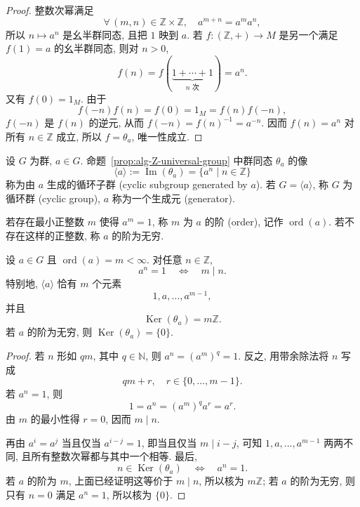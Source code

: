 \documentclass[usesamecnt, thmcnt=section, lang=cn, newtx, 10pt, scheme=chinese]{elegantbook}
\begin{document}
\begin{proof}
整数次幂满足
\[
\forall\,(m,n)\in\mathbb Z\times\mathbb Z,\quad a^{m+n}=a^ma^n,
\]
所以 $n\mapsto a^n$ 是幺半群同态, 且把 $1$ 映到 $a$. 若 $f:(\mathbb Z,+)\to M$ 是另一个满足 $f(1)=a$ 的幺半群同态, 则对 $n>0$,
\[
 f(n)=f(\underbrace{1+\cdots+1}_{n\text{ 次}})=a^n.
\]
又有 $f(0)=1_M$. 由于
\[
 f(-n)f(n)=f(0)=1_M=f(n)f(-n),
\]
$f(-n)$ 是 $f(n)$ 的逆元, 从而 $f(-n)=f(n)^{-1}=a^{-n}$. 因而 $f(n)=a^n$ 对所有 $n\in\mathbb Z$ 成立, 所以 $f=\theta_a$, 唯一性成立.
\end{proof}

\begin{definition}[循环子群与元素的阶]\label{def:alg-order-element}
设 $G$ 为群, $a\in G$. 命题~\ref{prop:alg-Z-universal-group} 中群同态 $\theta_a$ 的像
\[
 \langle a\rangle:=\operatorname{Im}(\theta_a)
 =\{a^n\mid n\in\mathbb Z\}
\]
称为由 $a$ {\color{blue}生成的循环子群 (cyclic subgroup generated by $a$)}. 若 $G=\langle a\rangle$, 称 $G$ 为{\color{blue}循环群 (cyclic group)}, $a$ 称为一个{\color{blue}生成元 (generator)}.

若存在最小正整数 $m$ 使得 $a^m=1$, 称 $m$ 为 $a$ 的{\color{blue}阶 (order)}, 记作 $\operatorname{ord}(a)$. 若不存在这样的正整数, 称 $a$ 的阶为无穷.
\end{definition}

\begin{proposition}\label{prop:alg-order-divisibility}
设 $a\in G$ 且 $\operatorname{ord}(a)=m<\infty$. 对任意 $n\in\mathbb Z$,
\[
 a^n=1\quad\Longleftrightarrow\quad m\mid n.
\]
特别地, $\langle a\rangle$ 恰有 $m$ 个元素
\[
 1,a,\ldots,a^{m-1},
\]
并且
\[
 \operatorname{Ker}(\theta_a)=m\mathbb Z.
\]
若 $a$ 的阶为无穷, 则 $\operatorname{Ker}(\theta_a)=\{0\}$.
\end{proposition}

\begin{proof}
若 $n$ 形如 $qm$, 其中 $q\in\mathbb N$, 则 $a^n=(a^m)^q=1$. 反之, 用带余除法将 $n$ 写成
\[
 qm+r,\quad r\in\{0,\ldots,m-1\}.
\]
若 $a^n=1$, 则
\[
 1=a^n=(a^m)^qa^r=a^r.
\]
由 $m$ 的最小性得 $r=0$, 因而 $m\mid n$.

再由 $a^i=a^j$ 当且仅当 $a^{i-j}=1$, 即当且仅当 $m\mid i-j$, 可知 $1,a,\ldots,a^{m-1}$ 两两不同, 且所有整数次幂都与其中一个相等. 最后,
\[
 n\in\operatorname{Ker}(\theta_a)
 \quad\Longleftrightarrow\quad
 a^n=1.
\]
若 $a$ 的阶为 $m$, 上面已经证明这等价于 $m\mid n$, 所以核为 $m\mathbb Z$; 若 $a$ 的阶为无穷, 则只有 $n=0$ 满足 $a^n=1$, 所以核为 $\{0\}$.
\end{proof}
\end{document}
